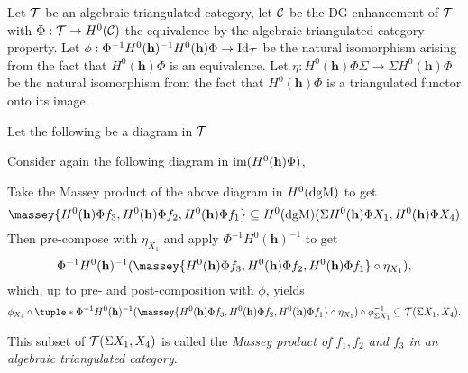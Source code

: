 \begin{definition}
    \label{def:massey_product_alg_tri_cat}
    Let \( {\mathcal{T}} \) be an algebraic triangulated category, let \( {\mathcal{C}} \) be the DG-enhancement of \( {\mathcal{T}} \) with \( \Phi: {\mathcal{T}} \to H^0({\mathcal{C}}) \) the equivalence by the algebraic triangulated category property. Let \( \phi: \Phi^{-1} H^0(\mathbf{h})^{-1} H^0(\mathbf{h}) \Phi \to \operatorname{Id}_{{\mathcal{T}}} \) be the natural isomorphism arising from the fact that \( H^0(\mathbf{h}) \Phi \) is an equivalence. Let \( \eta: H^0(\mathbf{h}) \Phi \Sigma \to \Sigma H^0(\mathbf{h}) \Phi \) be the natural isomorphism from the fact that \( H^0(\mathbf{h}) \Phi \) is a triangulated functor onto its image.
    
    Let the following be a diagram in \( {\mathcal{T}} \)
    \begin{center}
    \end{center}
    Consider again the following diagram in \( \operatorname{im}(H^0(\mathbf{h}) \Phi) \),
    \begin{center}
    \end{center}
    Take the Massey product of the above diagram in \( H^0(\operatorname{dgM}) \) to get
    \[
        \massey{H^0(\mathbf{h}) \Phi f_3, H^0(\mathbf{h}) \Phi f_2, H^0(\mathbf{h}) \Phi f_1} \subseteq H^0(\dgM)(\Sigma H^0(\mathbf{h}) \Phi X_1, H^0(\mathbf{h}) \Phi X_4)
    \]
    Then pre-compose with \( \eta_{X_1} \) and apply \( \Phi^{-1} H^0(\mathbf{h})^{-1} \) to get
    \[
        \Phi^{-1} H^0(\mathbf{h})^{-1} (\massey{H^0(\mathbf{h}) \Phi f_3, H^0(\mathbf{h}) \Phi f_2, H^0(\mathbf{h}) \Phi f_1} \circ \eta_{X_1}),
    \]
    which, up to pre- and post-composition with \( \phi \), yields
    \[
        \phi_{X_4} \circ \tuple*{\Phi^{-1} H^0(\mathbf{h})^{-1} (\massey{H^0(\mathbf{h}) \Phi f_3, H^0(\mathbf{h}) \Phi f_2, H^0(\mathbf{h}) \Phi f_1} \circ \eta_{X_1})} \circ \phi^{-1}_{\Sigma X_1} \subseteq \Tc(\Sigma X_1, X_4).
    \]

    This subset of \( {\mathcal{T}}(\Sigma X_1, X_4) \) is called the \emph{Massey product of \( f_1, f_2 \) and \( f_3 \) in an algebraic triangulated category}.
\end{definition}

